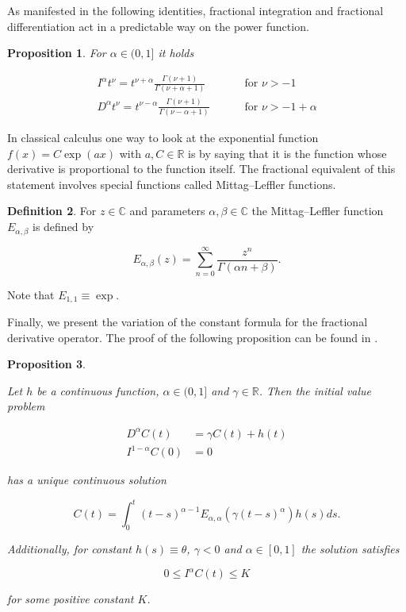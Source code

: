 \documentclass[12pt,twoside]{article}
\theoremstyle{plain}
\theoremstyle{plain}
\newtheorem{proposition}{Proposition}[section]
\theoremstyle{definition}
\newtheorem{definition}[proposition]{Definition}
\theoremstyle{remark}
\numberwithin{equation}{section}
\begin{document}
\vspace{5pt}

As manifested in the following identities, fractional integration and fractional differentiation act in a predictable way on the power function.

\begin{proposition}

For $\alpha \in(0, 1]$ it holds

\begin{equation}
\label{eq: fractional derivatives of powers}
\begin{aligned}
I^{\alpha} t^{\nu}=t^{\nu+\alpha} \frac{\Gamma(\nu+1)}{\Gamma(\nu+\alpha+1)} & \qquad\text { for } \nu>-1 \\[10pt]
D^{\alpha} t^{\nu}=t^{\nu-\alpha} \frac{\Gamma(\nu+1)}{\Gamma(\nu-\alpha+1)} & \qquad\text { for } \nu>-1+\alpha
\end{aligned}
\end{equation}
\end{proposition}

In classical calculus one way to look at the exponential function $f(x) = C \exp(ax)$ with $a, C \in \mathbb R$ is by saying that it is the function whose derivative is proportional to the function itself. The fractional equivalent of this statement involves special functions called Mittag–Leffler functions.

\begin{definition}

For $z \in \mathbb C$ and parameters $\alpha, \beta \in \mathbb C$ the Mittag–Leffler function $E_{\alpha, \beta}$ is defined by

$$
E_{\alpha, \beta}(z)=\sum_{n = 0} ^\infty \frac{z^{n}}{\Gamma(\alpha n+\beta)}.
$$

Note that $E_{1,1}\equiv \exp$.

\end{definition}

Finally, we present the variation of the constant formula for the fractional derivative operator. The proof of the following proposition can be found in \cite{P99}.

\begin{proposition}
\label{eq: fractional variation of constant}

Let $h$ be a continuous function, $\alpha \in(0,1]$ and $\gamma \in \mathbb R$. Then the initial value problem

$$
\begin{aligned}
D^{\alpha} C(t)&=\gamma C(t)+h(t) \\[10pt]
I^{1-\alpha} C(0)&=0
\end{aligned}
$$

has a unique continuous solution

$$
C(t)=\int_{0}^{t}(t-s)^{\alpha-1} E_{\alpha, \alpha}\left(\gamma(t-s)^{\alpha}\right) h(s) ds.
$$

Additionally, for constant $h(s)\equiv \theta$, $\gamma < 0$ and $\alpha \in [0,1]$ the solution satisfies

$$
0 \leq I^\alpha C(t) \leq K
$$

for some positive constant $K$.

\end{proposition}
\end{document}
